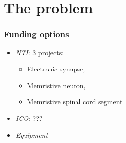 \documentclass[12pt, aspectratio=169]{beamer}
\begin{document}

\section{The problem} 
\begin{frame}
\frametitle{Funding options}
\begin{itemize}
\item \emph{NTI}: 3 projects:
\begin{itemize}
\item Electronic synapse,
\item Memristive neuron,
\item Memristive spinal cord segment
\end{itemize}
\item \emph{ICO}: ???
\item \emph{Equipment}
\end{itemize}
\end{frame}
\end{document}
